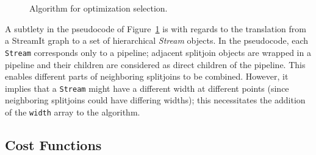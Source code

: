 \documentclass{sig-alternate}
\begin{document}
{\begin{figure}[t]
  \vspace{-4pt}
  \vspace{-16pt}
  \caption{Algorithm for optimization selection.
  \vspace{-22pt}
  \protect\label{fig:part-alg}}
\end{figure}

A subtlety in the pseudocode of Figure~\ref{fig:part-alg} is with
regards to the translation from a StreamIt graph to a set of
hierarchical {\it Stream} objects.  In the pseudocode, each {\tt
Stream} corresponds only to a pipeline; adjacent splitjoin objects are
wrapped in a pipeline and their children are considered as direct
children of the pipeline. This enables different parts of neighboring
splitjoins to be combined.  However, it implies that a {\tt Stream}
might have a different width at different points (since neighboring
splitjoins could have differing widths); this necessitates the
addition of the {\tt width} array to the algorithm.

\subsection{Cost Functions}
\label{sec:cost}

}
\end{document}
